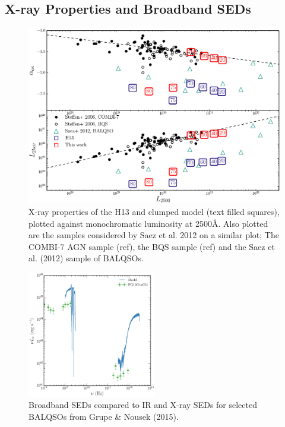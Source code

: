 \documentclass[useAMS,usenatbib]{mn2e_x}
\begin{document}
\subsection{X-ray Properties and Broadband SEDs}

\begin{figure} %
\centering
\includegraphics[width=1.0\textwidth]{figures/alpha_ox_both.eps}
\caption
{
X-ray properties of the H13 and clumped model (text filled 
squares), plotted against monochromatic luminosity 
at 2500\AA. Also plotted are the samples considered by
Saez et al. 2012 on a similar plot; The COMBI-7 AGN sample (ref),
the BQS sample (ref) and the Saez et al. (2012) sample of BALQSOs.
}
\label{fig:xray}
\end{figure} %

\begin{figure}
\centering
\includegraphics[width=0.5\textwidth]{figures/xray_spectrum_lnu.eps}
\caption
{
Broadband SEDs compared to IR and X-ray SEDs for selected BALQSOs 
from Grupe \& Nousek (2015).
}
\label{fig:xray}
\end{figure}
\end{document}
